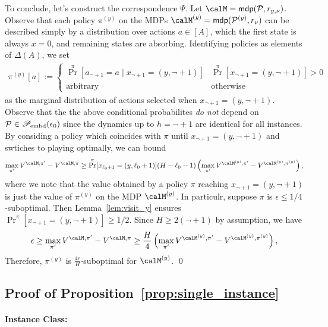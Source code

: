 To conclude, let's construct the correspondence $\Psi$. Let $\calM = \mdp(\calP,r_{y,\nu})$.
Observe that each policy $\pi^{(y)}$ on the MDPs $\calM^{(y)} = \mdp(\calP^{(y)},r_{\nu})$ can be described simply by a distribution over actions $a \in [A]$, which the first state is always $x = 0$, and remaining states are absorbing. Identifying policies as elements of $\Delta(A)$, we set
\begin{align*}
\pi^{(y)}[a] :=  \begin{cases} \Pr^{\pi}[ a_{\lnot + 1} = a \mid x_{\lnot + 1} = (y,\lnot + 1)] & \Pr^{\pi}[x_{\lnot + 1} = (y,\lnot + 1)] > 0  \\
\text{arbitrary} & \text{otherwise}
\end{cases}
\end{align*}
as the marginal distribution of actions selected when $x_{\lnot+1} = (y,\lnot + 1)$. Observe that the the above conditional probabilites \emph{do not} depend on $\mathcal{P} \in \mathscr{P}_{\mathrm{embd}}(\epsilon_0)$ since the dynamics up to $h = \lnot + 1$ are identical for all instances. By considing a policy which coincides with $\pi$ until $x_{\lnot + 1} = (y,\lnot + 1)$ and swtiches to playing optimally, we can bound
\begin{align*}
\max_{\pi'} V^{\calM,\pi'}- V^{\calM,\pi} \ge \Pr^{\pi}[x_{\lnot + 1} = (y,\lnot + 1)] (H - \lnot -1)\left(\max_{\pi'}V^{\calM^{(y)},\pi'}- V^{\calM^{(y)},\pi^{(y)}}\right),
\end{align*}
where we note that the value obtained by a policy $\pi$ reaching $x_{\lnot + 1} = (y,\lnot + 1)$ is just the value of $\pi^{(y)}$ on the MDP $\calM^{(y)}$. In particulr, suppose $\pi$ is $\epsilon \le 1/4$-suboptimal. Then  Lemma~\ref{lem:visit_y} ensures $\Pr^{\pi}[x_{\lnot + 1} = (y,\lnot + 1)] \ge 1/2$. Since $H \ge 2(\lnot+1)$ by assumption, we have
\begin{align*}
\epsilon \ge \max_{\pi'} V^{\calM,\pi'}- V^{\calM,\pi} \ge \frac{H}{4}\left(\max_{\pi'}V^{\calM^{(y)},\pi'}- V^{\calM^{(y)},\pi^{(y)}}\right),
\end{align*}
Therefore, $\pi^{(y)}$ is $\frac{4\epsilon}{H}$-suboptimal for $\calM^{(y)}$. \qed
\subsection{Proof of Proposition~\ref{prop:single_instance}}
\paragraph{Instance Class: }

